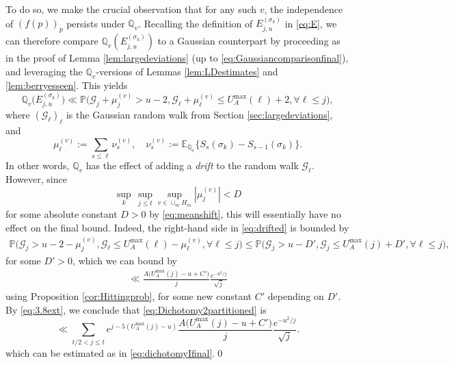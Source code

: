 \documentclass{amsart}
\theoremstyle{definition}
\theoremstyle{remark}
\numberwithin{equation}{section}
\begin{document}
To do so, we make the crucial observation that for any such $v$, the  independence of $(f(p))_{p}$ persists under $\mathbb{Q}_{v}$. Recalling the definition of $E_{j,u}^{(\sigma_k)}$ in \eqref{eq:E}, we can therefore compare $\mathbb{Q}_{v}(E_{j,u}^{(\sigma_k)})$ to a Gaussian counterpart by proceeding as in the proof of Lemma \ref{lem:largedeviations} (up to \eqref{eq:Gaussiancomparisonfinal}), and leveraging the $\mathbb{Q}_{v}$-versions of Lemmas \ref{lem:LDestimates} and \ref{lem:berryesseen}. This yields
\begin{equation}\label{eq:drifted}
        \mathbb{Q}_{v}\big(E_{j,u}^{(\sigma_k)}\big)\ll  \mathbb{P}\Big(\mathcal{G}_j+\mu_j^{(v)}>u-2, \mathcal{G}_\ell+\mu_\ell^{(v)}\leq U_A^{\max}(\ell)+2, \forall \ell\leq j\Big),
\end{equation}
where $(\mathcal{G}_\ell)_{\ell}$ is the Gaussian random walk from Section \ref{sec:largedeviations}, and
\[
    \mu_\ell^{(v)}:=\sum_{s\leq \ell}\nu_s^{(v)},\quad \nu_s^{(v)}:= \mathbb{E}_{\mathbb{Q}_{v}}\big\{S_s(\sigma_k)-S_{s-1}(\sigma_k)\big\}.
\]
In other words, $\mathbb{Q}_{v}$ has the effect of adding a \textit{drift} to the random walk $\mathcal{G}_\ell$. However, since 
\[
   \sup_{k}\, \sup_{j\leq t} \sup_{v\in \cup_m H_m}|\mu_{j}^{(v)}|<D
\]
for some absolute constant $D>0$ by \eqref{eq:meanshift}, this will essentially have no effect on the final bound. Indeed, the right-hand side in \eqref{eq:drifted} is bounded by
\begin{align*}
  \mathbb{P}\Big(\mathcal{G}_j>u-2-\mu_j^{(v)}, \mathcal{G}_\ell\leq U_A^{\max}(\ell)-\mu_\ell^{(v)}, \forall \ell\leq j\Big) \leq \mathbb{P}\Big(\mathcal{G}_j>u-D', \mathcal{G}_j\leq U_A^{\max}(j)+D', \forall \ell\leq j\Big),
\end{align*}
for some $D'>0$, which we can bound by
\begin{align*}
        \ll \frac{A\big(U_A^{\text{max}}(j)-u+C'\big)}{j}\frac{e^{-u^2/j}}{\sqrt{j}}
\end{align*}
using Proposition \ref{cor:Hittingprob}, for some new constant $C'$ depending on $D'$. By \eqref{eq:3.8ext}, we conclude that \eqref{eq:Dichotomy2partitioned} is
 \[
    \ll \sum_{t/2<j\leq t} e^{j-5(U_A^{\max}(j)-u)}\frac{A\big(U_A^{\text{max}}(j)-u+C'\big)}{j}\frac{e^{-u^2/j}}{\sqrt{j}}.
 \]
which can be estimated as in \eqref{eq:dichotomyIfinal}.\qedhere \qed
\end{document}

